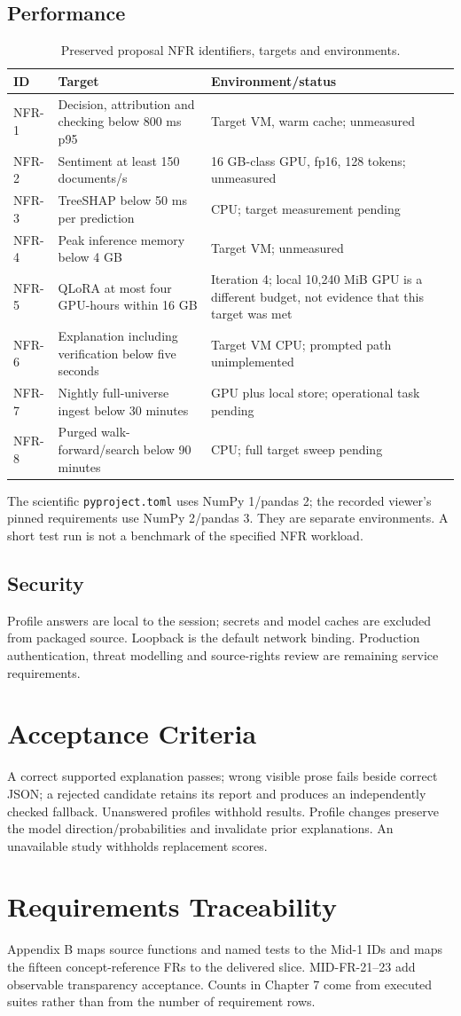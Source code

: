 \subsection{Performance}
\begin{longtable}{p{}p{}p{}}
\caption{Preserved proposal NFR identifiers, targets and environments.}\label{tab:nfr-targets}\\\toprule ID & Target & Environment/status\\\midrule
NFR-1 & Decision, attribution and checking below 800 ms p95 & Target VM, warm cache; unmeasured\\
NFR-2 & Sentiment at least 150 documents/s & 16 GB-class GPU, fp16, 128 tokens; unmeasured\\
NFR-3 & TreeSHAP below 50 ms per prediction & CPU; target measurement pending\\
NFR-4 & Peak inference memory below 4 GB & Target VM; unmeasured\\
NFR-5 & QLoRA at most four GPU-hours within 16 GB & Iteration 4; local 10,240 MiB GPU is a different budget, not evidence that this target was met\\
NFR-6 & Explanation including verification below five seconds & Target VM CPU; prompted path unimplemented\\
NFR-7 & Nightly full-universe ingest below 30 minutes & GPU plus local store; operational task pending\\
NFR-8 & Purged walk-forward/search below 90 minutes & CPU; full target sweep pending\\
\bottomrule\end{longtable}
The scientific \nolinkurl{pyproject.toml} uses NumPy 1/pandas 2; the recorded viewer's pinned requirements use NumPy 2/pandas 3. They are separate environments. A short test run is not a benchmark of the specified NFR workload.
\subsection{Security}
Profile answers are local to the session; secrets and model caches are excluded from packaged source. Loopback is the default network binding. Production authentication, threat modelling and source-rights review are remaining service requirements.
\section{Acceptance Criteria}
A correct supported explanation passes; wrong visible prose fails beside correct JSON; a rejected candidate retains its report and produces an independently checked fallback. Unanswered profiles withhold results. Profile changes preserve the model direction/probabilities and invalidate prior explanations. An unavailable study withholds replacement scores.
\section{Requirements Traceability}
Appendix B maps source functions and named tests to the Mid-1 IDs and maps the fifteen concept-reference FRs to the delivered slice. MID-FR-21--23 add observable transparency acceptance. Counts in Chapter 7 come from executed suites rather than from the number of requirement rows.
